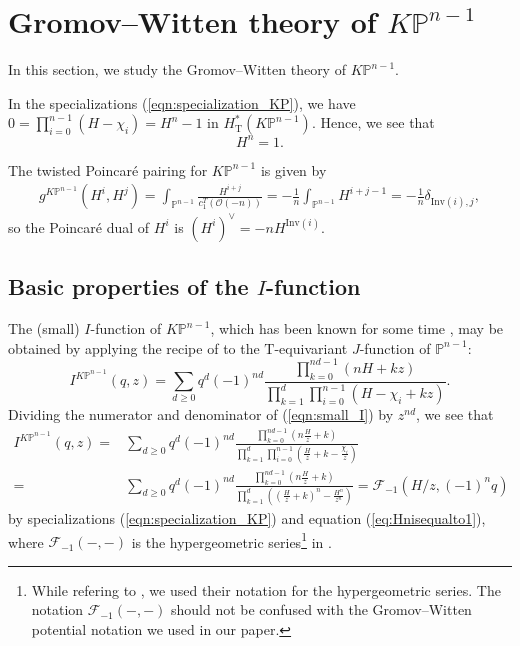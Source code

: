\documentclass[12pt]{amsart}
\numberwithin{equation}{section}
\newcommand{\KP}{K\mathbb{P}}
\begin{document}
\section{Gromov--Witten theory of \texorpdfstring{$K\mathbb{P}^{n-1}$}{KP{n-1}}}\label{sec:GWKP}

In this section, we study the Gromov--Witten theory of $\KP^{n-1}$.

In the specializations (\ref{eqn:specialization_KP}), we have $0=\prod_{i=0}^{n-1}\left(H-\chi_i\right)=H^n-1$ in $H_{\mathrm{T}}^*(\KP^{n-1})$. Hence, we see that 
\begin{equation}\label{eq:Hnisequalto1}
H^n=1.
\end{equation}



The twisted Poincar\'e pairing for $K\mathbb{P}^{n-1}$ is given by
\begin{equation}\label{eqn:metric_KP}
\begin{split}
g^{{K\mathbb{P}^{n-1}}}(H^i,H^j)
=\int_{\mathbb{P}^{n-1}}\frac{H^{i+j}}{c_1^T(\mathcal{O}(-n))}
=-\frac{1}{n}\int_{\mathbb{P}^{n-1}}{H^{i+j-1}}
=-\frac{1}{n}\delta_{\mathrm{Inv}(i),j},
\end{split}
\end{equation}
so the Poincar\'e dual of $H^i$ is $(H^i)^\vee=-nH^{\text{Inv}(i)}$.

\subsection{Basic properties of the \texorpdfstring{$I$}{I}-function}\label{sec:I_func}

\vspace{1em}
The (small) $I$-function of $K\mathbb{P}^{n-1}$, which has been known for some time \cite{g0}, may be obtained by applying the recipe of \cite{ccit} to the $\mathrm{T}$-equivariant $J$-function of $\mathbb{P}^{n-1}$: 
\begin{equation}\label{eqn:small_I}
I^{K\mathbb{P}^{n-1}}(q,z)
=\sum_{d\geq{0}}q^d(-1)^{nd}\frac{\prod_{k=0}^{nd-1}(nH+kz)}{\prod_{k=1}^d\prod_{i=0}^{n-1}(H-\chi_i+kz)}.
\end{equation}
Dividing the numerator and denominator of (\ref{eqn:small_I}) by $z^{nd}$, we see that
\begin{equation}\label{eqn:I_KP_interms_of_F_minus_1}
\begin{aligned}
I^{K\mathbb{P}^{n-1}}(q,z)
=&\sum_{d\geq{0}}q^d(-1)^{nd}\frac{\prod_{k=0}^{nd-1}(n\frac{H}{z}+k)}{\prod_{k=1}^d\prod_{i=0}^{n-1}(\frac{H}{z}+k-\frac{\chi_i}{z})}\\
=&\sum_{d\geq{0}}q^d(-1)^{nd}\frac{\prod_{k=0}^{nd-1}(n\frac{H}{z}+k)}{\prod_{k=1}^d((\frac{H}{z}+k)^n-\frac{H^n}{z^n})}=\mathcal{F}_{-1}\left(H/z,(-1)^nq\right)
\end{aligned}
\end{equation}
by specializations (\ref{eqn:specialization_KP}) and equation (\ref{eq:Hnisequalto1}), where $\mathcal{F}_{-1}(-,-)$ is the hypergeometric series\footnote{While refering to \cite{zz}, we used their notation for the hypergeometric series. The notation $\mathcal{F}_{-1}(-,-)$ should not be confused with the Gromov--Witten potential notation we used in our paper.} in \cite[Section 2]{zz}.
\end{document}
